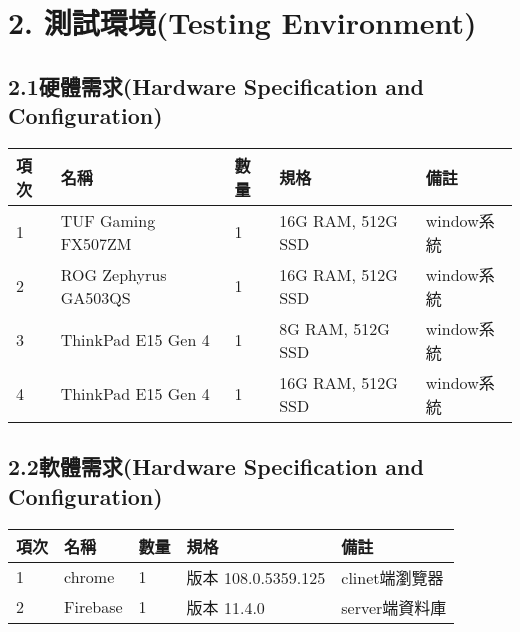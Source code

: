 \documentclass{report}
\begin{document}
\section*{2. 測試環境(Testing Environment)}
\subsection*{2.1硬體需求(Hardware Specification and Configuration)}
\begin{tabularx}{\textwidth}{
  |p{}%
  |p{}%
  |p{}%
  |p{}%
  |p{}%
}
  \hline
  項次 &  名稱 & 數量 & 規格  & 備註  \\ \hline
  1 & TUF Gaming FX507ZM & 1 & 16G RAM, 512G SSD & window系統  \\ \hline
  2 & ROG Zephyrus GA503QS & 1 & 16G RAM, 512G SSD & window系統  \\ \hline
  3 & ThinkPad E15 Gen 4 & 1 & 8G RAM, 512G SSD & window系統  \\ \hline
  4 & ThinkPad E15 Gen 4 & 1 & 16G RAM, 512G SSD & window系統  \\ \hline
  
\end{tabularx}

\subsection*{2.2軟體需求(Hardware Specification and Configuration)}
\begin{tabularx}{\textwidth}{
  |p{}%
  |p{}%
  |p{}%
  |p{}%
  |p{}%
}
  \hline
  項次 &  名稱 & 數量 & 規格  & 備註  \\ \hline
  1 & chrome & 1 & 版本 108.0.5359.125 & clinet端瀏覽器  \\ \hline
  2 & Firebase & 1 & 版本 11.4.0 & server端資料庫  \\ \hline
\end{tabularx}
\end{document}

